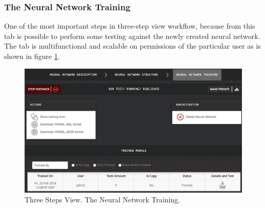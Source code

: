\subsubsection{The Neural Network Training}

One of the most important steps in three-step view workflow, because from this tab is possible to perform some testing against the newly created neural network. The tab is multifunctional and scalable on permissions of the particular user as is shown in figure \ref{fig:training_3_steps}.

\begin{figure}[H]
\begin{center}
  \includegraphics[width=\linewidth]{components/5/img/training_3_steps.png}
  \caption{Three Steps View. The Neural Network Training.}
  \label{fig:training_3_steps}
\end{center}
\end{figure}

